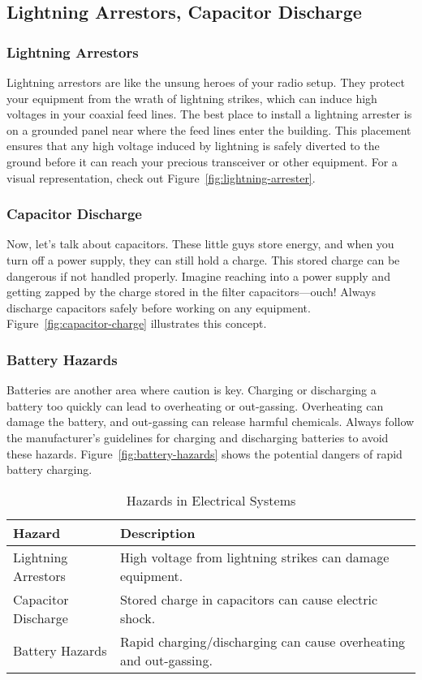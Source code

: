 \subsection{Lightning Arrestors, Capacitor Discharge}
\label{subsec:lightning-cap}

\subsubsection*{Lightning Arrestors}
Lightning arrestors are like the unsung heroes of your radio setup. They protect your equipment from the wrath of lightning strikes, which can induce high voltages in your coaxial feed lines. The best place to install a lightning arrester is on a grounded panel near where the feed lines enter the building. This placement ensures that any high voltage induced by lightning is safely diverted to the ground before it can reach your precious transceiver or other equipment. For a visual representation, check out Figure~\ref{fig:lightning-arrester}.

\subsubsection*{Capacitor Discharge}
Now, let's talk about capacitors. These little guys store energy, and when you turn off a power supply, they can still hold a charge. This stored charge can be dangerous if not handled properly. Imagine reaching into a power supply and getting zapped by the charge stored in the filter capacitors—ouch! Always discharge capacitors safely before working on any equipment. Figure~\ref{fig:capacitor-charge} illustrates this concept.

\subsubsection*{Battery Hazards}
Batteries are another area where caution is key. Charging or discharging a battery too quickly can lead to overheating or out-gassing. Overheating can damage the battery, and out-gassing can release harmful chemicals. Always follow the manufacturer's guidelines for charging and discharging batteries to avoid these hazards. Figure~\ref{fig:battery-hazards} shows the potential dangers of rapid battery charging.

\begin{table}[h]
    \centering
    \caption{Hazards in Electrical Systems}
    \label{tab:electrical-hazards}
    \begin{tabular}{|l|l|}
        \hline
        \textbf{Hazard} & \textbf{Description} \\
        \hline
        Lightning Arrestors & High voltage from lightning strikes can damage equipment. \\
        Capacitor Discharge & Stored charge in capacitors can cause electric shock. \\
        Battery Hazards & Rapid charging/discharging can cause overheating and out-gassing. \\
        \hline
    \end{tabular}
\end{table}

